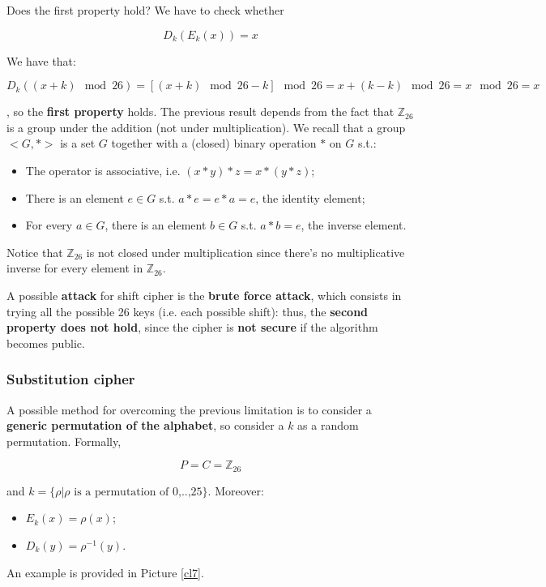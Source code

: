 Does the first property hold? We have to check whether

$$
D_k(E_k(x)) = x
$$

We have that:

$$
D_k((x+k)\mod26) = [(x+k)\mod26 - k]\mod26 = x + (k-k)\mod26 = x\mod26 = x
$$

, so the \textbf{first property} holds. The previous result depends from the fact that $\mathbb{Z}_{26}$ is a group under the addition (not under multiplication). We recall that a group $<G,*>$ is a set $G$ together with a (closed) binary operation $*$ on $G$ s.t.:

\begin{itemize}
    \item The operator is associative, i.e. $(x*y)*z = x*(y*z)$;
    \item There is an element $e \in G$ s.t. $a*e = e*a = e$, the identity element;
    \item For every $a \in G$, there is an element $b \in G$ s.t. $a*b = e$, the inverse element.
\end{itemize}

Notice that $\mathbb{Z}_{26}$ is not closed under multiplication since there's no multiplicative inverse for every element in $\mathbb{Z}_{26}$.

A possible \textbf{attack} for shift cipher is the \textbf{brute force attack}, which consists in trying all the possible 26 keys (i.e. each possible shift): thus, the \textbf{second property does not hold}, since the cipher is \textbf{not secure} if the algorithm becomes public.

\subsubsection{Substitution cipher}
A possible method for overcoming the previous limitation is to consider a \textbf{generic permutation of the alphabet}, so consider a $k$ as a random permutation. Formally, 

$$
P = C = \mathbb{Z}_{26}
$$

and $k = \{\rho|\rho \text{ is a permutation of 0,..,25}\}$. Moreover:

\begin{itemize}
    \item $E_k(x) = \rho(x)$;
    \item $D_k(y) = \rho^{-1}(y)$.
\end{itemize}

An example is provided in Picture \ref{cl7}.

